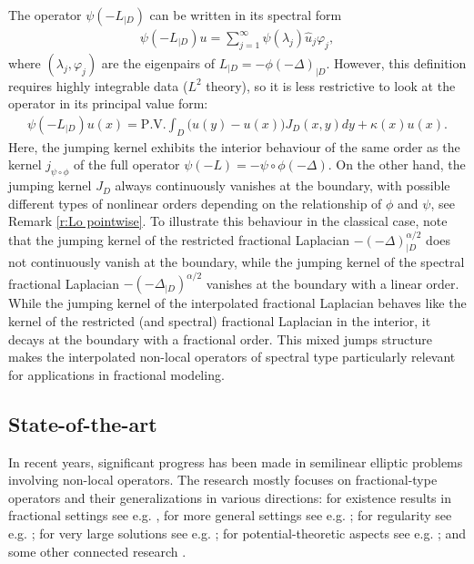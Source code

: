 \documentclass[12pt,a4paper,onecolumn]{article}
\theoremstyle{definition}
\newcommand{\1}{\mathbf 1}
\newcommand{\wh}{\widehat}
\newcommand{\Lbase}{L_{|D}}
\newcommand{\Lo}{\psi(-L_{|D})}
\numberwithin{equation}{section}
\begin{document}
    
   
    The operator $\Lo$ can be written in its spectral form
    \begin{align*}
        \Lo u=\sum_{j=1}^\infty  \psi(\lambda_j)\wh u_j \varphi_j,
    \end{align*}
    where $(\lambda_j,\varphi_j)$ are the eigenpairs of $\Lbase= - \phi(-\Delta)_{|D}$. However, this definition requires highly integrable data ($L^2$ theory), so it is less restrictive to look at the operator in its principal value form:
    \begin{align*}
        \Lo u(x)= \textrm{P.V.}\int_D\big(u(y)-u(x)\big)J_D(x,y)dy+\kappa(x)u(x).
    \end{align*}
    Here, the jumping kernel exhibits the interior behaviour of the same order as the kernel $j_{\psi\circ\phi}$ of the full operator $\psi(-L)=-\psi\circ\phi(-\Delta)$. On the other hand, the jumping kernel $J_D$ always continuously vanishes at the boundary, with possible different types of nonlinear orders depending on the relationship of $\phi$ and $\psi$, see Remark \ref{r:Lo pointwise}. To illustrate this behaviour in the classical case, note that the jumping kernel of the restricted fractional Laplacian $-(-\Delta)_{|D}^{ \alpha/2}$ does not continuously vanish at the boundary, while the jumping kernel of the spectral fractional Laplacian $-(-\Delta_{|D})^{\alpha/2}$ vanishes at the boundary with a linear order. While the jumping kernel of the interpolated fractional Laplacian behaves like the kernel of the restricted (and spectral) fractional Laplacian in the interior, it decays at the boundary with a fractional order. This mixed jumps structure makes the interpolated non-local operators of spectral type particularly relevant for applications in fractional modeling. 

       \subsection*{State-of-the-art}

    In recent years, significant progress has been made in semilinear elliptic problems involving non-local operators. The research mostly focuses on fractional-type operators and their generalizations in various directions: for existence results in fractional settings see e.g. \cite{Aba15a,BC17,BCBF18,bogdan_et_al_19,CFQ,chen_veron,dhifli2012,F20,FQ12}, for more general settings see e.g. \cite{BVW-na21,BJ20,Bio23cpaa,HuynhNguyen2022_new, KlimsiakRozkosz25}; for regularity see e.g. \cite{BMS-boundaryreg-23,grubb2016,Ros-OtonSerra2016}; for very large solutions see e.g. \cite{Aba17,BCBF16}; for potential-theoretic aspects see e.g. \cite{ksv_minimal2016,ksv2020boundary,Bio21jmaa,SongVondracek2006potenSpecial}; and some other connected research \cite{FJ23,SV2014,CKSV22,BW25,CVW25}.
  
\end{document}
